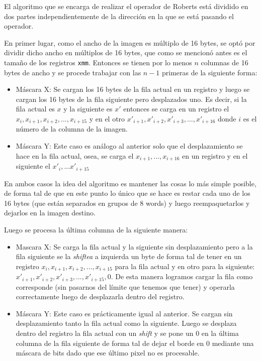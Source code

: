 El algoritmo que se encarga de realizar el operador de Roberts está dividido en dos partes independientemente de la dirección en la que se está pasando el operador. 

En primer lugar, como el ancho de la imagen es múltiplo de 16 bytes, se optó por dividir dicho ancho en múltiplos de 16 bytes, que como se mencionó antes es el tamaño de los registros \texttt{xmm}. Entonces se tienen por lo menos $n$ columnas de 16 bytes de ancho y se procede trabajar con las $n-1$ primeras de la siguiente forma: 
\begin{itemize}
\item Máscara X: Se cargan los 16 bytes de la fila actual en un registro y luego se cargan los 16 bytes de la fila siguiente pero desplazados uno. Es decir, si la fila actual es $x$ y la siguiente es $x'$ entonces se carga en un registro el $x_i, x_{i+1}, x_{i+2}, ... , x_{i+15}$ y en el otro $x'_{i+1}, x'_{i+2}, x'_{i+3}, ... , x'_{i+16}$ donde $i$ es el número de la columna de la imagen. 
\item Máscara Y: Este caso es análogo al anterior solo que el desplazamiento se hace en la fila actual, osea, se carga el $x_{i+1}, ..., x_{i+16}$ en un registro y en el siguiente el $x'_i, ... x'_{i+15}$
\end{itemize}

En ambos casos la idea del algoritmo es mantener las cosas lo más simple posible, de forma tal de que en este punto lo único que se hace es restar cada uno de los 16 bytes (que están separados en grupos de 8 words) y luego reempaquetarlos y dejarlos en la imagen destino. 

Luego se procesa la última columna de la siguiente manera:
\begin{itemize}
\item Mascara X: Se carga la fila actual y la siguiente sin desplazamiento pero a la fila siguiente se la \emph{shiftea} a izquierda un byte de forma tal de tener en un registro $x_i, x_{i+1}, x_{i+2}, ... , x_{i+15}$ para la fila actual y en otro para la siguiente: $x'_{i+1}, x'_{i+2}, x'_{i+3}, ..., x'_{i+15}, 0$. De esta manera logramos cargar la fila como corresponde (sin pasarnos del límite que tenemos que tener) y operarla correctamente luego de desplazarla dentro del registro. 
\item Máscara Y: Este caso es prácticamente igual al anterior. Se cargan sin desplazamiento tanto la fila actual como la siguiente. Luego se desplaza dentro del registro la fila actual con un \emph{shift} y se pone un 0 en la última columna de la fila siguiente de forma tal de dejar el borde en 0 mediante una máscara de bits dado que ese último pixel no es procesable.
\end{itemize}

